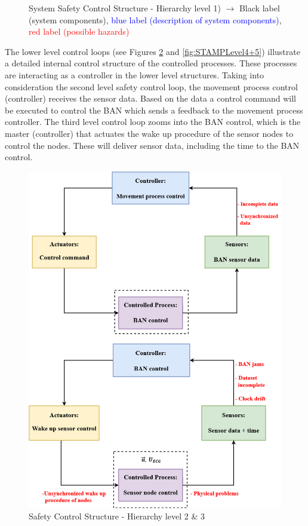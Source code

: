 \documentclass[review]{elsarticle}
\begin{document}
\begin{itemize}
\begin{figure}[!ht]
		\caption[System Safety Control Structure]{System Safety Control Structure - Hierarchy level 1) $\rightarrow$ Black label (system components), \textcolor{blue}{blue label (description of system components)}, \textcolor{red}{red label (possible hazards)}}
		\label{fig:STAMPLevel1}
	\end{figure}
	\newpage
	The lower level control loops (see Figures \ref{fig:STAMPLevel2+3} and \ref{fig:STAMPLevel4+5}) illustrate a detailed internal control structure of the controlled processes. These processes are interacting as a controller in the lower level structures. Taking into consideration the second level safety control loop, the movement process control (controller) receives the sensor data. Based on the data a control command will be executed to control the BAN which sends a feedback to the movement process controller. The third level control loop zooms into the BAN control, which is the master (controller) that actuates the wake up procedure of the sensor nodes to control the nodes. These will deliver sensor data, including the time to the BAN control.
	\begin{figure}[!ht]
		\centering
		\includegraphics[scale=0.53]{Images/STAMP2+3level(3)}
		\caption[Safety Control Structure - Hierarchy level 2 \& 3]{Safety Control Structure - Hierarchy level 2 \& 3}
		\label{fig:STAMPLevel2+3}
	\end{figure} 


\end{itemize}
\end{document}
